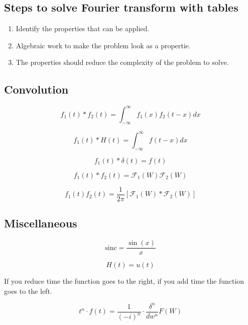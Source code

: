 \documentclass[letterpaper]{article}
\newcommand{\divline}{\noindent\makebox[\linewidth]{\rule{\textwidth}{0.4pt}}}
\begin{document}
        \divline

        \begin{multicols}{2}
            \section{Steps to solve Fourier transform with tables}

                \begin{enumerate}
                    \item Identify the properties that can be applied.
                    \item Algebraic work to make the problem look as a propertie.
                    \item The properties should reduce the complexity of the problem to solve.
                \end{enumerate}

        \end{multicols}

        \divline

        \begin{multicols}{2}
            \section{Convolution}

                \[f_{1}(t) * f_{2}(t) = \int_{-\infty}^{\infty} f_{1}(x)f_{2}(t-x)dx \]
                
                \[f_{1}(t) * H(t) = \int_{-\infty}^{\infty} f(t-x)dx \]

                \[f_{1}(t) * \delta(t) = f(t) \]

                \[f_{1}(t) * f_{2}(t) = \mathcal{F}_{1}(W) \mathcal{F}_{2}(W) \]

                \[f_{1}(t) f_{2}(t) = \frac{1}{2\pi} [\mathcal{F}_{1}(W) * \mathcal{F}_{2}(W)] \]
        
        \end{multicols}
        
        \divline

        \begin{multicols}{2}
            \section{Miscellaneous}

                \[\text{sinc} = \frac{\sin(x)}{x}\]

                \[H(t) = u(t)\]

                If you reduce time the function goes to the right, if you add time the function goes to the left.

                \[t^{n} \cdot f(t) = \frac{1}{(-i)^{n}} \cdot \frac{\delta^{n}}{dw^{n}} F(W)\]
        
        \end{multicols}
 
	\divline
 
\end{document}

